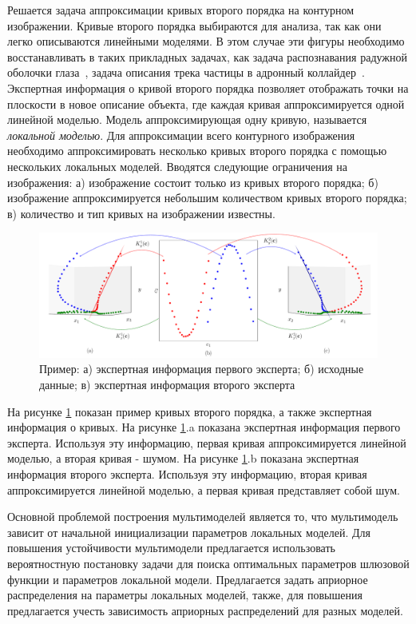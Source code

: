 Решается задача аппроксимации кривых второго порядка на контурном изображении. Кривые второго порядка выбираются для анализа, так как они легко описываются линейными моделями. В этом случае эти фигуры необходимо восстанавливать в таких прикладных задачах, как задача распознавания радужной оболочки глаза~\cite{Matveev2010,Matveev2014,Bowyer2010}, задача описания трека частицы в адронный коллайдер~\cite{Dalila2018}. Экспертная информация о кривой второго порядка позволяет отображать точки на плоскости в новое описание объекта, где каждая кривая аппроксимируется одной линейной моделью. Модель аппроксимирующая одну кривую, называется \textit{локальной моделью}. Для аппроксимации всего контурного изображения необходимо аппроксимировать несколько кривых второго порядка с помощью нескольких локальных моделей. Вводятся следующие ограничения на изображения: а) изображение состоит только из кривых второго порядка; б) изображение аппроксимируется небольшим количеством кривых второго порядка; в) количество и тип кривых на изображении известны.

\begin{figure}[h!]
\center
     \includegraphics[width=\textwidth]{results/priorexpertfig/explanation}
     \caption{Пример: а) экспертная информация первого эксперта; б) исходные данные; в) экспертная информация второго эксперта}
    \label{intro:fig2}
\end{figure}
На рисунке \ref{intro:fig2} показан пример кривых второго порядка, а также экспертная информация о кривых. На рисунке \ref{intro:fig2}.a показана экспертная информация первого эксперта. Используя эту информацию, первая кривая аппроксимируется линейной моделью, а вторая кривая - шумом. На рисунке \ref{intro:fig2}.b показана экспертная информация второго эксперта. Используя эту информацию, вторая кривая аппроксимируется линейной моделью, а первая кривая представляет собой шум.

Основной проблемой построения мультимоделей является то, что мультимодель зависит от начальной инициализации параметров локальных моделей. Для повышения устойчивости мультимодели предлагается использовать вероятностную постановку задачи для поиска оптимальных параметров шлюзовой функции и параметров локальной модели. Предлагается задать априорное распределения на параметры локальных моделей, также, для повышения предлагается учесть зависимость априорных распределений для разных моделей.

